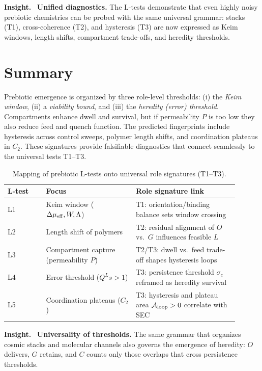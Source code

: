 \documentclass[12pt,a4paper,oneside]{scrreprt}
\newenvironment{insight}{\par\vspace{0.5em}\noindent\textbf{Insight.}\ }{\par\vspace{0.5em}}
\begin{document}
\begin{insight}
\textbf{Unified diagnostics.} 
The L-tests demonstrate that even highly noisy prebiotic chemistries 
can be probed with the same universal grammar: 
stacks (T1), cross-coherence (T2), and hysteresis (T3) 
are now expressed as Keim windows, length shifts, 
compartment trade-offs, and heredity thresholds. 
\end{insight}

\section*{Summary}

Prebiotic emergence is organized by three role-level thresholds: 
(i) the \emph{Keim window}, (ii) a \emph{viability bound}, 
and (iii) the \emph{heredity (error) threshold}. 
Compartments enhance dwell and survival, but if permeability $P$ is too low 
they also reduce feed and quench function. 
The predicted fingerprints include hysteresis across control sweeps, 
polymer length shifts, and coordination plateaus in $C_2$. 
These signatures provide falsifiable diagnostics 
that connect seamlessly to the universal tests T1--T3.

\begin{table}[h!]
\centering
\caption{Mapping of prebiotic L-tests onto universal role signatures (T1--T3).}
\begin{tabular}{p{0.15\linewidth} p{0.35\linewidth} p{0.4\linewidth}}
\toprule
\textbf{L-test} & \textbf{Focus} & \textbf{Role signature link} \\
\midrule
L1 & Keim window ($\Delta\mu_{\rm eff}, W, \Lambda$) & T1: orientation/binding balance sets window crossing \\
L2 & Length shift of polymers & T2: residual alignment of $O$ vs.\ $G$ influences feasible $L$ \\
L3 & Compartment capture (permeability $P$) & T2/T3: dwell vs.\ feed trade-off shapes hysteresis loops \\
L4 & Error threshold ($Q^L s > 1$) & T3: persistence threshold $\sigma_c$ reframed as heredity survival \\
L5 & Coordination plateaus ($C_2$) & T3: hysteresis and plateau area $\mathcal A_{\rm loop}>0$ correlate with SEC \\
\bottomrule
\end{tabular}
\end{table}

\begin{insight}
\textbf{Universality of thresholds.} 
The same grammar that organizes cosmic stacks and molecular channels 
also governs the emergence of heredity: 
$O$ delivers, $G$ retains, and $C$ counts only those overlaps 
that cross persistence thresholds. 
\end{insight}
\end{document}
